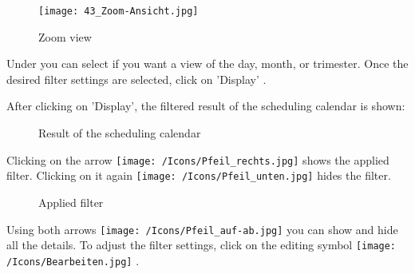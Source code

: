 
\vspace{\baselineskip}

\begin{figure}
  \vspace{-30pt}
  \begin{center}
    \texttt{[image: 43\_Zoom-Ansicht.jpg]}
  \end{center}
  \vspace{-20pt}
  \caption{Zoom view}
  \vspace{-10pt}
\end{figure}
Under  you can select if you want a view of the day, month, or trimester. Once the desired filter settings are selected, click on 'Display' .

\vspace{\baselineskip}
\vspace{\baselineskip}

After clicking on 'Display', the filtered result of the scheduling calendar is shown:

\begin{figure}[H]
\caption{Result of the scheduling calendar}
\end{figure}

Clicking on the arrow \texttt{[image: /Icons/Pfeil\_rechts.jpg]}  shows the applied filter. Clicking on it again \texttt{[image: /Icons/Pfeil\_unten.jpg]}  hides the filter.

\begin{figure}[H]
\caption{Applied filter}
\end{figure}

Using both arrows \texttt{[image: /Icons/Pfeil\_auf-ab.jpg]}  you can show and hide all the details. To adjust the filter settings, click on the editing symbol \texttt{[image: /Icons/Bearbeiten.jpg]} .
